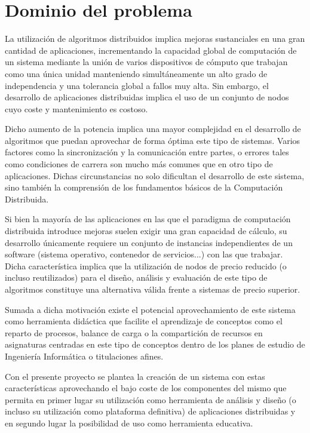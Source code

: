 \chapter{Dominio del problema}

La utilización de algoritmos distribuidos implica mejoras sustanciales en una gran cantidad de aplicaciones, incrementando la capacidad global de computación de un sistema mediante la unión de varios dispositivos de cómputo que trabajan como una única unidad manteniendo simultáneamente un alto grado de independencia y una tolerancia global a fallos muy alta. Sin embargo, el desarrollo de aplicaciones distribuidas implica el uso de un conjunto de nodos cuyo coste y mantenimiento es costoso.

Dicho aumento de la potencia implica una mayor complejidad en el desarrollo de algoritmos que puedan aprovechar de forma óptima este tipo de sistemas. Varios factores como la sincronización y la comunicación entre partes, o errores tales como condiciones de carrera son mucho más comunes que en otro tipo de aplicaciones. Dichas circunstancias no solo dificultan el desarrollo de este sistema, sino también la comprensión de los fundamentos básicos de la Computación Distribuida. %

Si bien la mayoría de las aplicaciones en las que el paradigma de computación distribuida introduce mejoras suelen exigir una gran capacidad de cálculo, su desarrollo únicamente requiere un conjunto de instancias independientes de un software (sistema operativo, contenedor de servicios...) con las que trabajar. Dicha característica implica que la utilización de nodos de precio reducido (o incluso reutilizados) para el diseño, análisis y evaluación de este tipo de algoritmos constituye una alternativa válida frente a sistemas de precio superior.

Sumada a dicha motivación existe el potencial aprovechamiento de este sistema como herramienta didáctica que facilite el aprendizaje de conceptos como el reparto de procesos, balance de carga o la compartición de recursos en asignaturas centradas en este tipo de conceptos dentro de los planes de estudio de Ingeniería Informática o titulaciones afines.

Con el presente proyecto se plantea la creación de un sistema con estas características aprovechando el bajo coste de los componentes del mismo que permita en primer lugar su utilización como herramienta de análisis y diseño (o incluso su utilización como plataforma definitiva) de aplicaciones distribuidas y en segundo lugar la posibilidad de uso como herramienta educativa.

